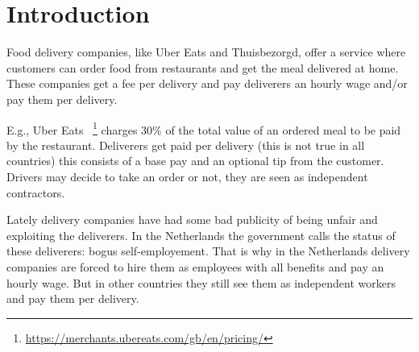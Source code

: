 \documentclass{article}
\begin{document}

    \printAffiliationsAndNotice



    \section{Introduction}

    Food delivery companies, like Uber Eats and Thuisbezorgd, offer a service where customers can order food from restaurants and get the meal delivered at home.
    These companies get a fee per delivery and pay deliverers an hourly wage and/or pay them per delivery.

    E.g., Uber Eats ~\footnote{\url{https://merchants.ubereats.com/gb/en/pricing/}} charges 30\% of the total value of an ordered meal to be paid by the restaurant.
    Deliverers get paid per delivery (this is not true in all countries) this consists of a base pay and an optional tip from the customer.
    Drivers may decide to take an order or not, they are seen as independent contractors.

    Lately delivery companies have had some bad publicity of being unfair and exploiting the deliverers.
    In the Netherlands the government calls the status of these deliverers: bogus self-employement.
    That is why in the Netherlands delivery companies are forced to hire them as employees with all benefits and pay an hourly wage.
    But in other countries they still see them as independent workers and pay them per delivery.
\end{document}
